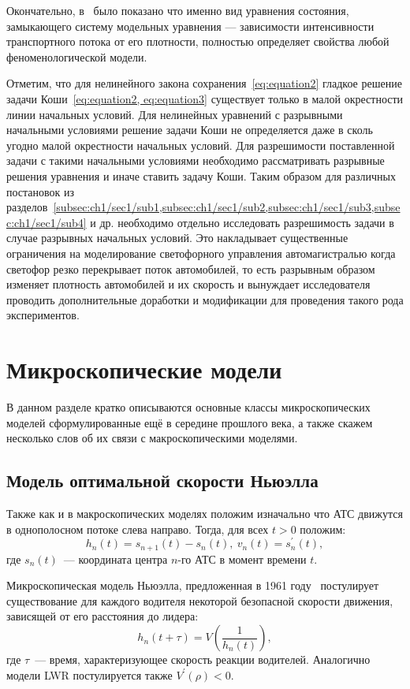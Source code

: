 Окончательно, в~\cite{collectiveArticle} было показано что именно вид уравнения состояния, замыкающего систему модельных уравнения --- зависимости интенсивности транспортного потока от его плотности, полностью определяет свойства любой феноменологической модели.

Отметим, что для нелинейного закона сохранения~\ref{eq:equation2} гладкое решение задачи Коши~\ref{eq:equation2, eq:equation3} существует только в малой окрестности линии начальных условий. Для нелинейных уравнений с разрывными начальными условиями решение задачи Коши не определяется даже в сколь угодно малой окрестности начальных условий.
Для разрешимости поставленной задачи с такими начальными условиями необходимо рассматривать разрывные решения уравнения и иначе ставить задачу Коши.
Таким образом для различных постановок из разделов~\ref{subsec:ch1/sec1/sub1,subsec:ch1/sec1/sub2,subsec:ch1/sec1/sub3,subsec:ch1/sec1/sub4} и др. необходимо отдельно исследовать разрешимость задачи в случае разрывных начальных условий.
Это накладывает существенные ограничения на моделирование светофорного управления автомагистралью когда светофор резко перекрывает поток автомобилей, то есть разрывным образом изменяет плотность автомобилей и их скорость и вынуждает исследователя проводить дополнительные доработки и модификации для проведения такого рода экспериментов.

\section{Микроскопические модели}\label{subsec:ch1/sec2}
В данном разделе кратко описываются основные классы микроскопических моделей сформулированные ещё в середине прошлого века, а также скажем несколько слов об их связи с макроскопическими моделями.

\subsection{Модель оптимальной скорости Ньюэлла}\label{subsec:ch1/sec2/sub1}
Также как и в макроскопических моделях положим изначально что АТС движутся в однополосном потоке слева направо. 
Тогда, для всех \(t>0\) положим:
\begin{equation}
    \label{eq:newell_base}
    h_n(t) = s_{n+1}(t) - s_n(t),\ v_n(t)=s_n^{'}(t),
\end{equation}
где \(s_n(t)\)~--- координата центра \(n\)-го АТС в момент времени \(t\).

Микроскопическая модель Ньюэлла, предложенная в 1961 году~\cite{newell1961nonlinear} постулирует существование для каждого водителя некоторой безопасной скорости движения, зависящей от его расстояния до лидера:
\begin{equation}\label{eq:newell}
  h_n(t+\tau) = V\left(\frac{1}{h_n(t)}\right),
\end{equation}
где \(\tau\)~--- время, характеризующее скорость реакции водителей.
Аналогично модели LWR постулируется также \(V^{'}(\rho) < 0\).

